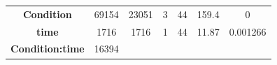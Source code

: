 \documentclass[]{article}
\theoremstyle{definition}
\theoremstyle{definition}
\theoremstyle{definition}
\theoremstyle{remark}
\begin{document}
\begin{longtable}[]{@{}ccccccc@{}}
\begin{minipage}[t]{0.22\columnwidth}
\textbf{Condition}\strut
\end{minipage} & \begin{minipage}[t]{0.09\columnwidth}\centering\strut
69154\strut
\end{minipage} & \begin{minipage}[t]{0.10\columnwidth}\centering\strut
23051\strut
\end{minipage} & \begin{minipage}[t]{0.08\columnwidth}\centering\strut
3\strut
\end{minipage} & \begin{minipage}[t]{0.08\columnwidth}\centering\strut
44\strut
\end{minipage} & \begin{minipage}[t]{0.10\columnwidth}\centering\strut
159.4\strut
\end{minipage} & \begin{minipage}[t]{0.12\columnwidth}\centering\strut
0\strut
\end{minipage}\tabularnewline
\begin{minipage}[t]{0.22\columnwidth}\centering\strut
\textbf{time}\strut
\end{minipage} & \begin{minipage}[t]{0.09\columnwidth}\centering\strut
1716\strut
\end{minipage} & \begin{minipage}[t]{0.10\columnwidth}\centering\strut
1716\strut
\end{minipage} & \begin{minipage}[t]{0.08\columnwidth}\centering\strut
1\strut
\end{minipage} & \begin{minipage}[t]{0.08\columnwidth}\centering\strut
44\strut
\end{minipage} & \begin{minipage}[t]{0.10\columnwidth}\centering\strut
11.87\strut
\end{minipage} & \begin{minipage}[t]{0.12\columnwidth}\centering\strut
0.001266\strut
\end{minipage}\tabularnewline
\begin{minipage}[t]{0.22\columnwidth}\centering\strut
\textbf{Condition:time}\strut
\end{minipage} & \begin{minipage}[t]{0.09\columnwidth}\centering\strut
16394\strut
\end{minipage} & \begin{minipage}[t]{0.10\columnwidth}\centering\strut

\end{minipage}
\end{longtable}
\end{document}
